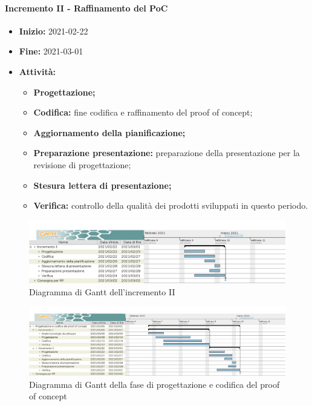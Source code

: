\paragraph[Incremento II]{Incremento II - \textnormal{Raffinamento del PoC}}
\begin{itemize}
    \item [] \textbf{Inizio:} 2021-02-22
    \item [] \textbf{Fine:} 2021-03-01
    \item [] \textbf{Attività:}
          \begin{itemize}
              \item \textbf{Progettazione;}
              \item \textbf{Codifica:} fine codifica e raffinamento del proof of concept;
              \item \textbf{Aggiornamento della pianificazione;}
              \item \textbf{Preparazione presentazione:} preparazione della presentazione per la revisione di progettazione;
              \item \textbf{Stesura lettera di presentazione;}
              \item \textbf{Verifica:} controllo della qualità dei prodotti sviluppati in questo periodo.
          \end{itemize}
\end{itemize}

\begin{figure}[H]
    \centering
    \includegraphics[width=1\linewidth]{res/images/pianificazione/incremento_2.png}
    \caption{Diagramma di Gantt dell'incremento II}
    \label{fig:_Gantt incremento II}
\end{figure}

\begin{figure}[H]
    \centering
    \includegraphics[width=1\linewidth]{res/images/pianificazione/progettazione_e_codifica_del_proof_of_concept.png}
    \caption{Diagramma di Gantt della fase di progettazione e codifica del proof of concept}
    \label{fig:_Gantt progettazione e codifica del proof of concept}
\end{figure}

